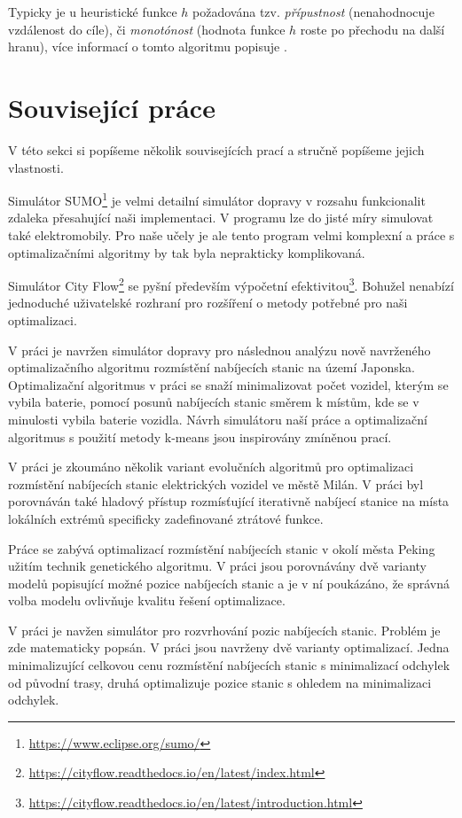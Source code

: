 Typicky je u heuristické funkce $h$ požadována tzv. \emph{přípustnost} 
(nenahodnocuje vzdálenost do cíle), či \emph{monotónost} 
(hodnota funkce $h$ roste po přechodu na další hranu), více
informací o tomto algoritmu popisuje \citet{russell2010artificial}.


\section{Související práce}
\label{sec:souvisejici_prace}

V této sekci si popíšeme několik souvisejících prací a stručně popíšeme 
jejich vlastnosti.


Simulátor SUMO\footnote{\url{https://www.eclipse.org/sumo/}} je velmi detailní
simulátor dopravy v rozsahu funkcionalit zdaleka přesahující naši implementaci.
V programu lze do jisté míry simulovat také elektromobily. Pro naše učely je
ale tento program velmi komplexní a práce s optimalizačními algoritmy
by tak byla neprakticky komplikovaná.

Simulátor City Flow\footnote{\url{https://cityflow.readthedocs.io/en/latest/index.html}}
se pyšní především výpočetní efektivitou\footnote{\url{https://cityflow.readthedocs.io/en/latest/introduction.html}}.
Bohužel nenabízí jednoduché uživatelské rozhraní pro rozšíření o metody
potřebné pro naši optimalizaci.

V práci \citet{kmeans_layout} je navržen simulátor dopravy pro následnou 
analýzu nově navrženého optimalizačního algoritmu rozmístění nabíjecích stanic
na území Japonska. Optimalizační algoritmus v práci se snaží minimalizovat 
počet vozidel, kterým se vybila baterie, pomocí posunů nabíjecích stanic směrem
k místům, kde se v minulosti vybila baterie vozidla. Návrh simulátoru naší práce
a optimalizační algoritmus s použití metody k-means jsou inspirovány zmíněnou
prací.

V práci \citet{niccolai2021optimization} je zkoumáno několik variant evolučních
algoritmů pro optimalizaci rozmístění nabíjecích stanic elektrických vozidel
ve městě Milán. V práci byl porovnáván také hladový přístup rozmísťující 
iterativně nabíjecí stanice na místa lokálních extrémů specificky zadefinované
ztrátové funkce. 

Práce \citet{zhu2016charging} se zabývá optimalizací rozmístění nabíjecích 
stanic v okolí města Peking užitím technik genetického algoritmu. V práci 
jsou porovnávány dvě varianty modelů popisující možné pozice nabíjecích stanic a
je v ní poukázáno, že správná volba modelu ovlivňuje kvalitu řešení optimalizace. 

V práci \citet{kinay2021full} je navžen simulátor pro rozvrhování pozic 
nabíjecích stanic. Problém je zde matematicky popsán. V práci jsou navrženy
dvě varianty optimalizací. Jedna minimalizující celkovou cenu rozmístění 
nabíjecích stanic s minimalizací odchylek od původní trasy, druhá optimalizuje
pozice stanic s ohledem na minimalizaci odchylek.